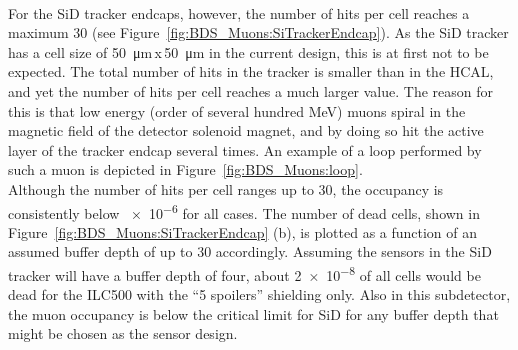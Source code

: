 \\For the SiD tracker endcaps, however, the number of hits per cell reaches a maximum 30 (see Figure~\ref{fig:BDS_Muons:SiTrackerEndcap}).
As the SiD tracker has a cell size of \SI{50}{\micro\meter}\,x\,\SI{50}{\micro\meter} in the current design, this is at first not to be expected.
The total number of hits in the tracker is smaller than in the HCAL, and yet the number of hits per cell reaches a much larger value.
The reason for this is that low energy (order of several hundred MeV) muons spiral in the magnetic field of the detector solenoid magnet, and by doing so hit the active layer of the tracker endcap several times.
An example of a loop performed by such a muon is depicted in Figure~\ref{fig:BDS_Muons:loop}.
\\Although the number of hits per cell ranges up to 30, the occupancy is consistently below \num{e-6} for all cases.
The number of dead cells, shown in Figure~\ref{fig:BDS_Muons:SiTrackerEndcap} (b), is plotted as a function of an assumed buffer depth of up to 30 accordingly.
Assuming the sensors in the SiD tracker will have a buffer depth of four, about \num{2e-8} of all cells would be dead for the ILC500 with the ``5 spoilers'' shielding only.
Also in this subdetector, the muon occupancy is below the critical limit for SiD for any buffer depth that might be chosen as the sensor design.
